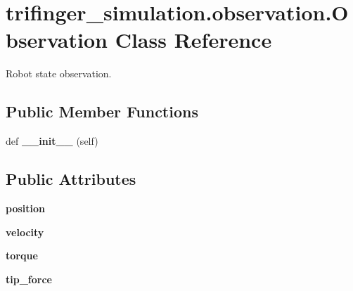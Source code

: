 \hypertarget{classtrifinger__simulation_1_1observation_1_1Observation}{}\section{trifinger\+\_\+simulation.\+observation.\+Observation Class Reference}
\label{classtrifinger__simulation_1_1observation_1_1Observation}


Robot state observation.  


\subsection*{Public Member Functions}
\begin{DoxyCompactItemize}
\item 
\mbox{\label{classtrifinger__simulation_1_1observation_1_1Observation_a6d34e53fbbb9a3521304ae8c97e17aaf}} 
def {\bfseries \+\_\+\+\_\+init\+\_\+\+\_\+} (self)
\end{DoxyCompactItemize}
\subsection*{Public Attributes}
\begin{DoxyCompactItemize}
\item 
\mbox{\label{classtrifinger__simulation_1_1observation_1_1Observation_a2d2ae7ce6488cbb763aa882416754c88}} 
{\bfseries position}
\item 
\mbox{\label{classtrifinger__simulation_1_1observation_1_1Observation_a2d00e9dd6083285a8e4bf28647a68a14}} 
{\bfseries velocity}
\item 
\mbox{\label{classtrifinger__simulation_1_1observation_1_1Observation_a5ade9796aa3ce3485199e0add841041f}} 
{\bfseries torque}
\item 
\mbox{\label{classtrifinger__simulation_1_1observation_1_1Observation_a1aa86681723679982157233f5a0d18f7}} 
{\bfseries tip\+\_\+force}
\end{DoxyCompactItemize}


